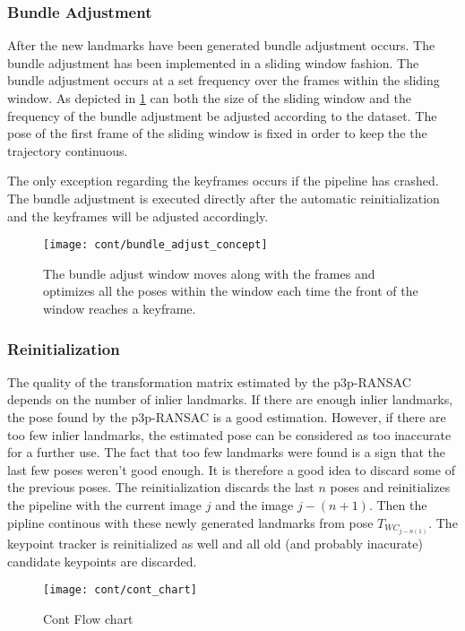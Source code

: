 \subsubsection{Bundle Adjustment}
\label{ba_cont}
After the new landmarks have been generated bundle adjustment occurs. The bundle adjustment has been implemented in a sliding window fashion. The bundle adjustment occurs at a set frequency over the frames within the sliding window. As depicted in \cref{fig:ba_concept} can both the size of the sliding window and the frequency of the bundle adjustment be adjusted according to the dataset. The pose of the first frame of the sliding window is fixed in order to keep the the trajectory continuous.

The only exception regarding the keyframes occurs if the pipeline has crashed. The bundle adjustment is executed directly after the automatic reinitialization and the keyframes will be adjusted accordingly.

\begin{figure}[!!h]
	\centering
	\texttt{[image: cont/bundle\_adjust\_concept]}
	\caption{The bundle adjust window moves along with the frames and optimizes all the poses within the window each time the front of the window reaches a keyframe.}
	\label{fig:ba_concept}
\end{figure}

\subsubsection{Reinitialization}
The quality of the transformation matrix estimated by the p3p-RANSAC depends on the number of inlier landmarks. If there are enough inlier landmarks, the pose found by the p3p-RANSAC is a good estimation. However, if there are too few inlier landmarks, the estimated pose can be considered as too inaccurate for a further use. The fact that too few landmarks were found is a sign that the last few poses weren't good enough. It is therefore a good idea to discard some of the previous poses. The reinitialization discards the last \begin{math} n \end{math} poses and reinitializes the pipeline with the current image \begin{math} j \end{math} and the image \begin{math} j-(n+1) \end{math}. Then the pipline continous with these newly generated landmarks from pose $T_{WC_{j-n(1)}}$. The keypoint tracker is reinitialized as well and all old (and probably inacurate) candidate keypoints are discarded.

\begin{figure}[ht]
	\centering
	\texttt{[image: cont/cont\_chart]}
	\caption{Cont Flow chart}
	\label{img_flow_cont}
\end{figure}